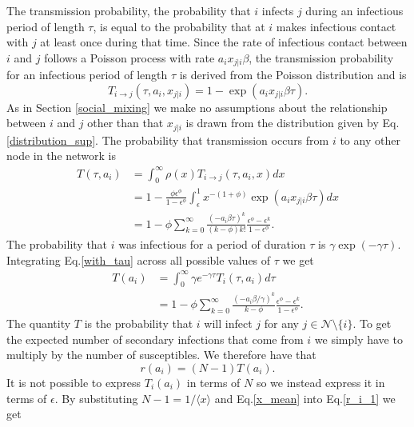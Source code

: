 \documentclass[10pt]{article}
\begin{document}
\begin{multicols}{2}
The transmission probability, the probability that $i$ infects $j$ during an infectious period of length $\tau$, is equal to the probability that at $i$ makes infectious contact with $j$ at least once during that time. Since the rate of infectious contact between $i$ and $j$ follows a Poisson process with rate $a_{i}x_{j|i}\beta$, the transmission probability for an infectious period of length $\tau$ is derived from the Poisson distribution and is
\begin{equation}
T_{i\rightarrow j}(\tau,a_{i},x_{j|i})=1-\exp(a_{i}x_{j|i}\beta\tau).
\end{equation}
As in Section \ref{social_mixing} we make no assumptions about the relationship between $i$ and $j$ other than that $x_{j|i}$ is drawn from the distribution given by Eq.\eqref{distribution_sup}. The probability that transmission occurs from $i$ to any other node in the network is
\begin{equation}
\label{with_tau}
\begin{split}
T(\tau,a_{i})&=\int_{0}^{\infty}\rho(x)T_{i\rightarrow j}(\tau,a_{i},x)dx\\
&=1-\frac{\phi\epsilon^{\phi}}{1-\epsilon^{\phi}}\int_{\epsilon}^{1}x^{-(1+\phi)}\exp(a_{i}x_{j|i}\beta\tau)dx\\
&=1-\phi\sum_{k=0}^{\infty}\frac{(-a_{i}\beta\tau)^{k}}{(k-\phi)k!}\frac{\epsilon^{\phi}-\epsilon^{k}}{1-\epsilon^{\phi}}.
\end{split}
\end{equation}
The probability that $i$ was infectious for a period of duration $\tau$ is $\gamma\exp(-\gamma\tau)$. Integrating Eq.\eqref{with_tau} across all possible values of $\tau$ we get
\begin{equation}
\label{without_tau}
\begin{split}
T(a_{i})&=\int_{0}^{\infty}\gamma e^{-\gamma\tau}T_{i}(\tau,a_{i})d\tau\\
&=1-\phi\sum_{k=0}^{\infty}\frac{(-a_{i}\beta/\gamma)^{k}}{k-\phi}\frac{\epsilon^{\phi}-\epsilon^{k}}{1-\epsilon^{\phi}}.
\end{split}
\end{equation}
The quantity $T$ is the probability that $i$ will infect $j$ for any $j\in\mathcal{N}\setminus\{i\}$. To get the expected number of secondary infections that come from $i$ we simply have to multiply by the number of susceptibles. We therefore have that 
\begin{equation}
\label{r_i_1}
r(a_{i})=(N-1)T(a_{i}).
\end{equation}
It is not possible to express $T_{i}(a_{i})$ in terms of $N$ so we instead express it in terms of $\epsilon$. By substituting $N-1=1/\langle x \rangle$ and Eq.\eqref{x_mean} into Eq.\eqref{r_i_1} we get

\end{multicols}
\end{document}
